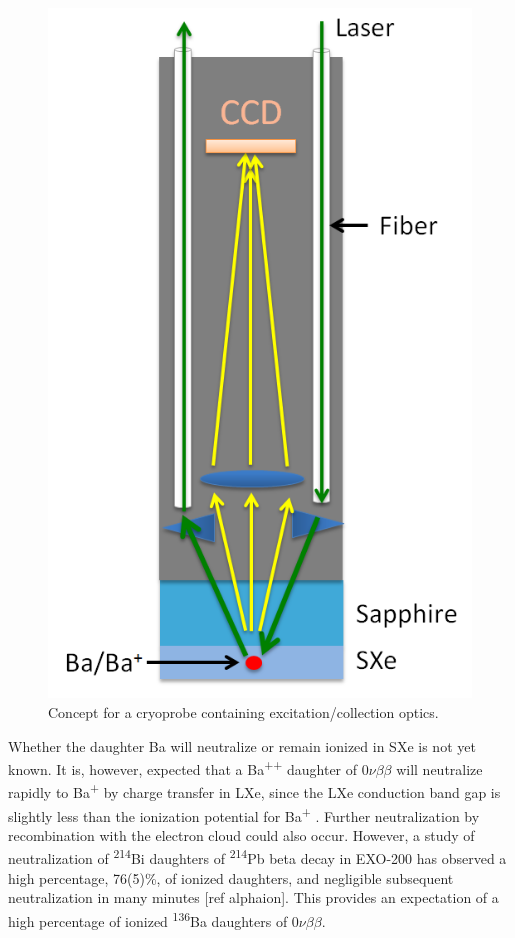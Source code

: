 \begin{figure} %
	\centering
	\includegraphics[width=.5\textwidth]{figures/probe_flat.png}
	\caption{Concept for a cryoprobe containing excitation/collection optics.}
\label{fig:probe}
\end{figure}

Whether the daughter Ba will neutralize or remain ionized in SXe is not yet known.  It is, however, expected that a Ba\textsuperscript{++} daughter of $0\nu\beta\beta$ will neutralize rapidly to Ba\textsuperscript{+} by charge transfer in LXe, since the LXe conduction band gap is slightly less than the ionization potential for Ba\textsuperscript{+} \cite{Moe1991}.  Further neutralization by recombination with the electron cloud could also occur.  However, a study of neutralization of \textsuperscript{214}Bi daughters of \textsuperscript{214}Pb beta decay in EXO-200 has observed a high percentage, 76(5)\%, of ionized daughters, and negligible subsequent neutralization in many minutes [ref alphaion].  This provides an expectation of a high percentage of ionized \textsuperscript{136}Ba daughters of $0\nu\beta\beta$.

